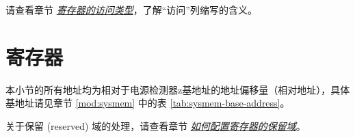 \documentclass[main\_\_CN.tex]{subfiles}
\begin{document}
请查看章节 \hyperref[glossary-access-types]{\textit{寄存器的访问类型}}，了解“访问”列缩写的含义。






\newpage
\section{寄存器}

本小节的所有地址均为相对于电源检测器z基地址的地址偏移量（相对地址），具体基地址请见章节 \ref{mod:sysmem} \textit{} 中的表 \ref{tab:sysmem-base-address}。

关于保留 (reserved) 域的处理，请查看章节 \hyperref[programming-reserved-field]{\textit{如何配置寄存器的保留域}}。


\end{document}
